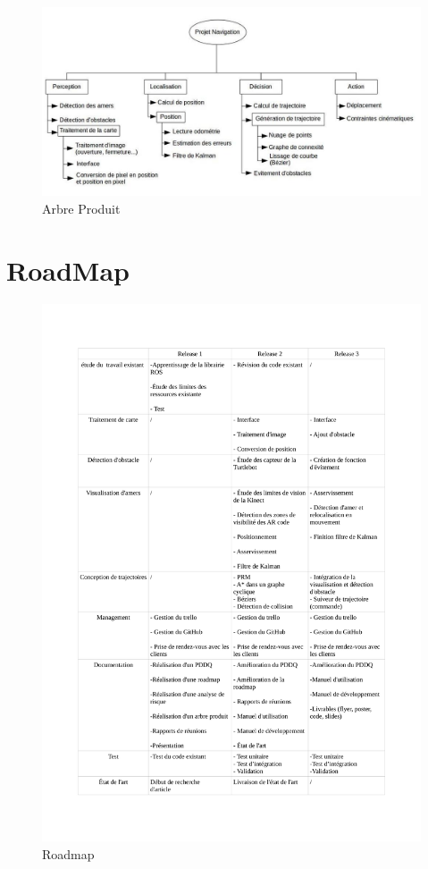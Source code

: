 \documentclass[10pt,a4paper]{article}
\begin{document}
\begin{figure}[!h]
  \centering
  \noindent\centerline{\includegraphics[scale=0.3]{Arbre_produit.png}}
  \caption{Arbre Produit}
\end{figure}

\newpage
\section{RoadMap}

\begin{figure}[!h]
  \noindent\centerline{\includegraphics[scale=0.26]{Roadmap.png}}
  \caption{Roadmap}
\end{figure}
\end{document}
